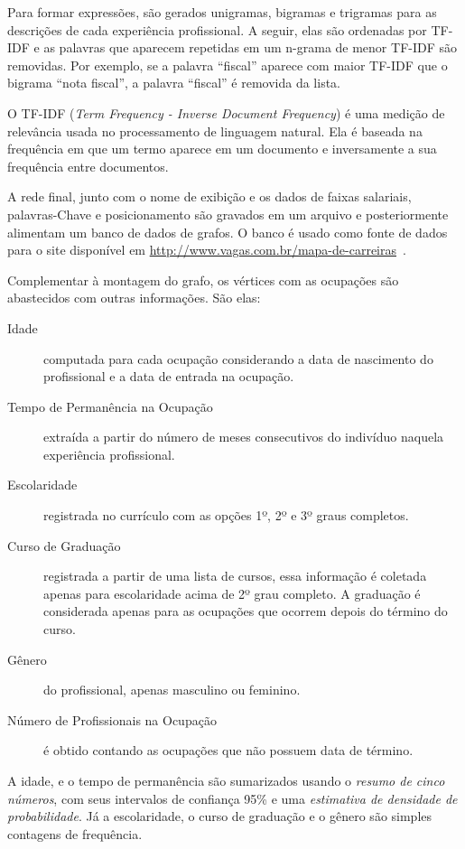 \documentclass[12pt,a4paper]{article}
\begin{document}
Para formar expressões, são gerados unigramas, bigramas e trigramas para as descrições de cada experiência profissional. A seguir, elas são ordenadas por TF-IDF e as palavras que aparecem repetidas em um n-grama de menor TF-IDF são removidas. Por exemplo, se a palavra \enquote{fiscal} aparece com maior TF-IDF que o bigrama \enquote{nota fiscal}, a palavra \enquote{fiscal} é removida da lista.

O TF-IDF (\textit{Term Frequency - Inverse Document Frequency}) é uma medição de relevância usada no processamento de linguagem natural. Ela é baseada na frequência em que um termo aparece em um documento e inversamente a sua frequência entre documentos.

A rede final, junto com o nome de exibição e os dados de faixas salariais, palavras-Chave e posicionamento são gravados em um arquivo e posteriormente alimentam um banco de dados de grafos. O banco é usado como fonte de dados para o site disponível em \url{http://www.vagas.com.br/mapa-de-carreiras}~\cite{VAGAS_Tecnologia2014-yv}.

Complementar à montagem do grafo, os vértices com as ocupações são abastecidos com outras informações. São elas:

\begin{description}
  \item[Idade] computada para cada ocupação considerando a data de nascimento do profissional e a data de entrada na ocupação.
  \item[Tempo de Permanência na Ocupação] extraída a partir do número de meses consecutivos do indivíduo naquela experiência profissional.
  \item[Escolaridade] registrada no currículo com as opções 1º, 2º e 3º graus completos.
  \item[Curso de Graduação] registrada a partir de uma lista de cursos, essa informação é coletada apenas para escolaridade acima de 2º grau completo. A graduação é considerada apenas para as ocupações que ocorrem depois do término do curso.
  \item[Gênero] do profissional, apenas masculino ou feminino.
  \item[Número de Profissionais na Ocupação] é obtido contando as ocupações que não possuem data de término.
\end{description}

A idade, e o tempo de permanência são sumarizados usando o \textit{resumo de cinco números}, com seus intervalos de confiança 95\% e uma \textit{estimativa de densidade de probabilidade}. Já a escolaridade, o curso de graduação e o gênero são simples contagens de frequência.
\end{document}
